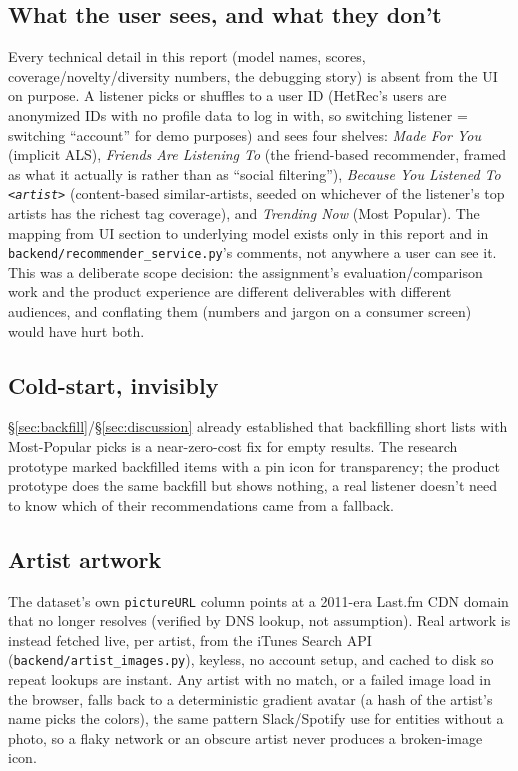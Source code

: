 \documentclass[11pt,a4paper]{article}
\newcommand{\code}[1]{\texttt{#1}}
\newcommand{\secref}[1]{\S\ref{#1}}
\begin{document}
\subsection{What the user sees, and what they don't}

Every technical detail in this report (model names, scores, coverage/novelty/diversity numbers, the debugging story) is absent from the UI on purpose. A listener picks or shuffles to a user ID (HetRec's users are anonymized IDs with no profile data to log in with, so switching listener = switching ``account'' for demo purposes) and sees four shelves: \emph{Made For You} (implicit ALS), \emph{Friends Are Listening To} (the friend-based recommender, framed as what it actually is rather than as ``social filtering''), \emph{Because You Listened To \texttt{<artist>}} (content-based similar-artists, seeded on whichever of the listener's top artists has the richest tag coverage), and \emph{Trending Now} (Most Popular). The mapping from UI section to underlying model exists only in this report and in \code{backend/recommender\_service.py}'s comments, not anywhere a user can see it. This was a deliberate scope decision: the assignment's evaluation/comparison work and the product experience are different deliverables with different audiences, and conflating them (numbers and jargon on a consumer screen) would have hurt both.

\subsection{Cold-start, invisibly}

\secref{sec:backfill}/\secref{sec:discussion} already established that backfilling short lists with Most-Popular picks is a near-zero-cost fix for empty results. The research prototype marked backfilled items with a pin icon for transparency; the product prototype does the same backfill but shows nothing, a real listener doesn't need to know which of their recommendations came from a fallback.

\subsection{Artist artwork}

The dataset's own \code{pictureURL} column points at a 2011-era Last.fm CDN domain that no longer resolves (verified by DNS lookup, not assumption). Real artwork is instead fetched live, per artist, from the iTunes Search API (\code{backend/artist\_images.py}), keyless, no account setup, and cached to disk so repeat lookups are instant. Any artist with no match, or a failed image load in the browser, falls back to a deterministic gradient avatar (a hash of the artist's name picks the colors), the same pattern Slack/Spotify use for entities without a photo, so a flaky network or an obscure artist never produces a broken-image icon.
\end{document}
